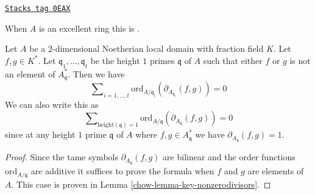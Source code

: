 \begin{lemma}

\label{chow-lemma-milnor-gersten-low-degree}
\href{https://stacks.math.columbia.edu/tag/0EAX}{\texttt{Stacks tag 0EAX}}

\begin{reference}
When $A$ is an excellent ring this is \cite[Proposition 1]{Kato-Milnor-K}.
\end{reference}
Let $A$ be a $2$-dimensional Noetherian local domain with fraction field $K$.
Let $f, g \in K^*$.
Let $\mathfrak q_1, \ldots, \mathfrak q_t$ be the height
$1$ primes $\mathfrak q$ of $A$ such that either $f$ or $g$ is not an
element of $A^*_{\mathfrak q}$.
Then we have
$$
\sum\nolimits_{i = 1, \ldots, t}
\text{ord}_{A/\mathfrak q_i}(\partial_{A_{\mathfrak q_i}}(f, g))
=
0
$$
We can also write this as
$$
\sum\nolimits_{\text{height}(\mathfrak q) = 1}
\text{ord}_{A/\mathfrak q}(\partial_{A_{\mathfrak q}}(f, g))
=
0
$$
since at any height $1$ prime $\mathfrak q$
of $A$ where $f, g \in A^*_{\mathfrak q}$
we have $\partial_{A_{\mathfrak q}}(f, g) = 1$.
\end{lemma}

\begin{proof}

Since the tame symbols $\partial_{A_{\mathfrak q}}(f, g)$ are
bilinear and the order functions $\text{ord}_{A/\mathfrak q}$
are additive it suffices to prove the formula when
$f$ and $g$ are elements of $A$. This case is proven in
Lemma \ref{chow-lemma-key-nonzerodivisors}.
\end{proof}

